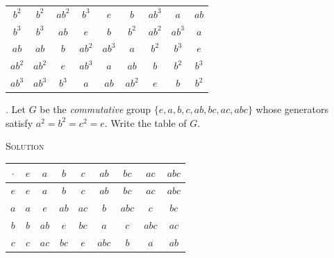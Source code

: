 \documentclass[twoside]{amsart}
\newcommand{\solution}{\textsc{Solution}\xspace}
\begin{document}
\begin{enumerate}[A.]
\begin{center}
\begin{tabular}{c|cccccccc}
    $b^2$ & $b^2$ & $ab^2$ & $b^3$ & $e$ & $b$ & $ab^3$ & $a$ & $ab$ \\

    $b^3$ & $b^3$ & $ab$ & $e$ & $b$ & $b^2$ & $ab^2$ & $ab^3$ & $a$ \\

    $ab$ & $ab$ & $b$ & $ab^2$ & $ab^3$ & $a$ & $b^2$ & $b^3$ & $e$ \\

    $ab^2$ & $ab^2$ & $e$ & $ab^3$ & $a$ & $ab$ & $b$ & $b^2$ & $b^3$ \\

    $ab^3$ & $ab^3$ & $b^3$ & $a$ & $ab$ & $ab^2$ & $e$ & $b$ & $b^2$
    \end{tabular}
    \end{center}

    . Let $G$ be the \emph{commutative} group 
    $\{e,a,b,c,ab,bc,ac,abc\}$ whose generators satisfy $a^2=b^2=c^2=e$.
    Write the table of $G$.

    \noindent \solution

    \begin{center}
    \begin{tabular}{c|cccccccc}
    $\cdot$ & $e$ & $a$ & $b$ & $c$ & $ab$ & $bc$ & $ac$ & $abc$ \\ \hline

    $e$ & $e$ & $a$ & $b$ & $c$ & $ab$ & $bc$ & $ac$ & $abc$ \\ 

    $a$ & $a$ & $e$ & $ab$ & $ac$ & $b$ & $abc$ & $c$ & $bc$ \\

    $b$ & $b$ & $ab$ & $e$ & $bc$ & $a$ & $c$ & $abc$ & $ac$ \\

    $c$ & $c$ & $ac$ & $bc$ & $e$ & $abc$ & $b$ & $a$ & $ab$ \\


\end{tabular}
\end{center}
\end{enumerate}
\end{document}
